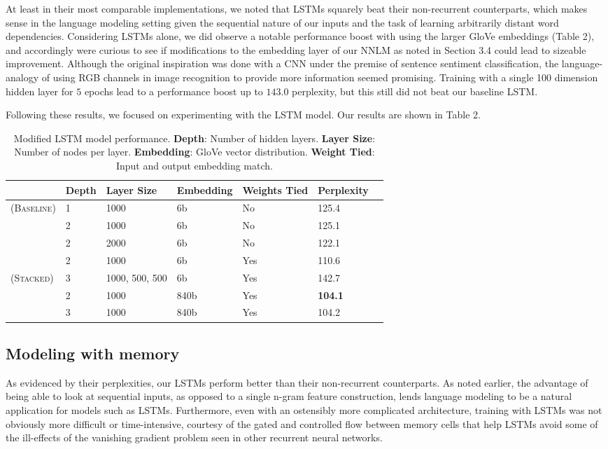 \documentclass[11pt]{article}
\begin{document}
At least in their most comparable implementations, we noted that LSTMs squarely beat their non-recurrent counterparts, which makes sense in the language modeling setting given the sequential nature of our inputs and the task of learning arbitrarily distant word dependencies. Considering LSTMs alone, we did observe a notable performance boost with using the larger GloVe embeddings (Table 2), and accordingly were curious to see if modifications to the embedding layer of our NNLM as noted in Section 3.4 could lead to sizeable improvement. Although the original inspiration was done with a CNN under the premise of sentence sentiment classification, the language-analogy of using RGB channels in image recognition to provide more information seemed promising. Training with a single 100 dimension hidden layer for $5$ epochs lead to a performance boost up to $143.0$ perplexity, but this still did not beat our baseline LSTM.

Following these results, we focused on experimenting with the LSTM model. Our results are shown in Table 2.

\begin{table}[h]
\centering
\begin{tabular}{llllllr}
 \toprule
& Depth & Layer Size & Embedding & Weights Tied & Perplexity \\
\midrule
 \textsc{(Baseline)} & 1 & 1000 & 6b & No & 125.4\\
  \textsc{} & 2 & 1000 & 6b & No & 125.1\\
  \textsc{} & 2 & 2000 & 6b & No & 122.1\\
  \textsc{} & 2 & 1000 & 6b & Yes & 110.6\\
  \textsc{(Stacked)} & 3 & 1000, 500, 500 & 6b & Yes & 142.7\\
  \textsc{} & 2 & 1000 & 840b & Yes & \bf{104.1}\\
  \textsc{} & 3 & 1000 & 840b & Yes & 104.2\\
 \bottomrule
\end{tabular}
\caption{\label{tab:results} Modified LSTM model performance. \textbf{Depth}: Number of hidden layers. \textbf{Layer Size}: Number of nodes per layer. \textbf{Embedding}: GloVe vector distribution. \textbf{Weight Tied}: Input and output embedding match.}
\end{table}

\subsection{Modeling with memory}
As evidenced by their perplexities, our LSTMs perform better than their non-recurrent counterparts. As noted earlier, the advantage of being able to look at sequential inputs, as opposed to a single n-gram feature construction, lends language modeling to be a natural application for models such as LSTMs. Furthermore, even with an ostensibly more complicated architecture, training with LSTMs was not obviously more difficult or time-intensive, courtesy of the gated and controlled flow between memory cells that help LSTMs avoid some of the ill-effects of the vanishing gradient problem seen in other recurrent neural networks.
\end{document}
